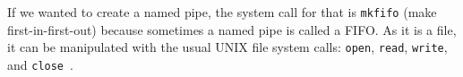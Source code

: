 If we wanted to create a named pipe, the system call for that is \texttt{mkfifo} (make first-in-first-out) because sometimes a named pipe is called a FIFO. As it is a file, it can be manipulated with the usual UNIX file system calls: \texttt{open}, \texttt{read}, \texttt{write}, and \texttt{close}~\cite{osc}.



